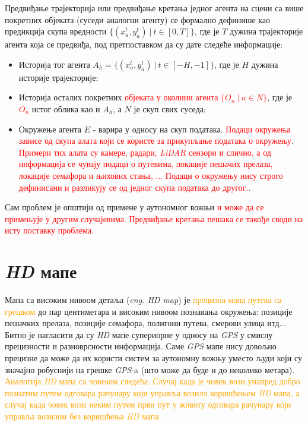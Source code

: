 \documentclass[11pt,oneside]{memoir}
\begin{document}
Предвиђање трајекторија или предвиђање кретања једног агента на сцени са више покретних објеката (суседи аналогни агенту) се формално
дефинише као предикција скупа вредности $\{(x^{t}_a, y^{t}_a)\ |\ t \in [0, T]\}$, где је $T$ дужина трајекторије агента која се предвиђа, 
под претпоставком да су дате следеће информације:
\begin{itemize}
  \item Историја тог агента $A_{h} = \{(x^{t}_a, y^{t}_a)\ |\ t \in [-H, -1]\}$, где је $H$ дужина историје трајекторије;
  \item Историја осталих покретних \textcolor{red}{објеката у околини агента $\{O_{n}\ |\ n \in N\}$}, 
        где је \textcolor{red}{$O_{n}$} истог облика као и $A_{h}$, а $N$ је скуп свих суседа;
  \item Окружење агента $E$ - варира у односу на скуп података. \textcolor{red}{Подаци окружења зависе од скупа алата који се користе
        за прикупљање података о окружењу. Примери тих алата су камере, радари, \textit{LiDAR} сензори и слично, а 
        од информација се чувају подаци о путевима,
        локације пешачих прелаза, локације семафора и њихових стања, ... Подаци о окружењу нису строго дефинисани и 
        разликују се од једног скупа података до другог.}.
\end{itemize}

Сам проблем је општији од примене у аутономног вожњи \textcolor{red}{и може да се примењује у другим случајевима. Предвиђање кретања пешака се
такође своди на исту поставку проблема.}

\section{\textit{HD} мапе}

Мапа са високим нивоом детаља (\textit{eng. HD map}) је \textcolor{orange}{прецизна
мапа путева са грешком} до пар центиметара и високим нивоом
познавања окружења: позиције пешачких прелаза, позиције семафора, полигони путева, смерови улица итд... Битно је нагласити
да су \textit{HD} мапе супериорне у односу на \textit{GPS} у смислу прецизности и разноврсности информација. Саме \textit{GPS}
мапе нису довољно прецизне да може да их користи систем за аутономну вожњу уместо људи који су значајно робуснији на грешке
\textit{GPS}-a (што може да буде и до неколико метара). \textcolor{orange}{Аналогија 
\textit{HD} мапа са човеком следећа: Случај када је човек вози унапред добро познатим путем одговара рачунару који управља
возило коришћењем \textit{HD} мапа, а случај када човек вози неким путем први пут у животу одговара рачунару који управља возилом
без коришћења \textit{HD} мапа.}
\end{document}
